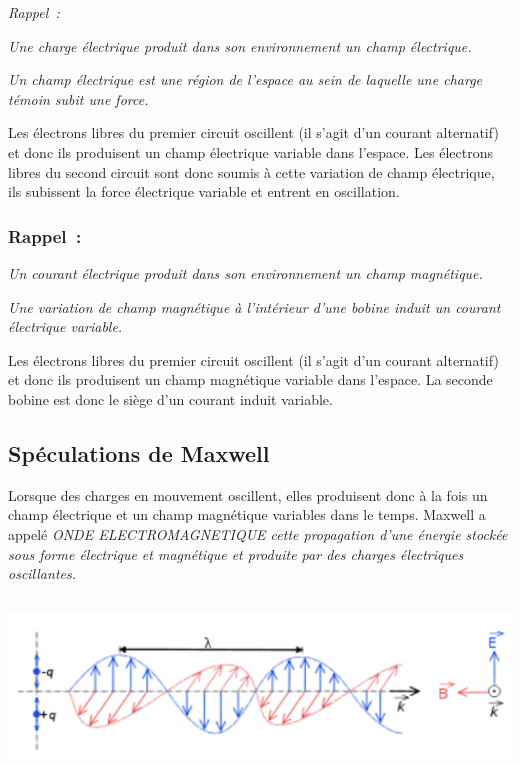 \emph{Rappel~:}

\emph{Une charge électrique produit dans son environnement un champ
électrique. }

\emph{Un champ électrique est une région de l'espace au sein de laquelle
une charge témoin subit une force. }

Les électrons libres du premier circuit oscillent (il s'agit d'un
courant alternatif) et donc ils produisent un champ électrique variable
dans l'espace. Les électrons libres du second circuit sont donc soumis à
cette variation de champ électrique, ils subissent la force électrique
variable et entrent en oscillation.

\subsubsection{Rappel~:}

\emph{Un courant électrique produit dans son environnement un champ
magnétique.}

\emph{Une variation de champ magnétique à l'intérieur d'une bobine
induit un courant électrique variable. }

Les électrons libres du premier circuit oscillent (il s'agit d'un
courant alternatif) et donc ils produisent un champ magnétique variable
dans l'espace. La seconde bobine est donc le siège d'un courant induit
variable.

\subsection{Spéculations de Maxwell}

Lorsque des charges en mouvement oscillent, elles produisent donc à la
fois un champ électrique et un champ magnétique variables dans le temps.
Maxwell a appelé \emph{ONDE ELECTROMAGNETIQUE cette propagation d'une
énergie stockée sous forme électrique et magnétique et produite par des
charges électriques oscillantes. }

\includegraphics[width=15.993cm,height=4.634cm]{Pictures/10000001000001DF0000008BE924D8E1387D9253.png}


